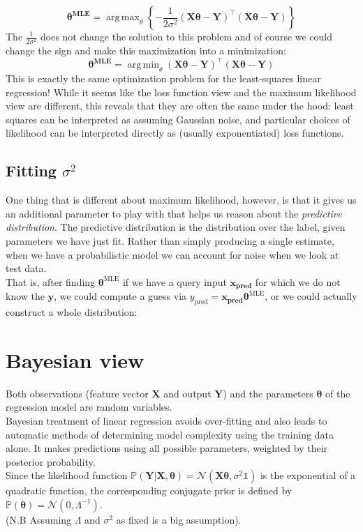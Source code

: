 \documentclass[twoside]{article}
\DeclareMathOperator*{\argmax}{arg\,max}
\DeclareMathOperator*{\argmin}{arg\,min}
\begin{document}
\begin{equation*}
    \boldsymbol{\theta^{\text{MLE}}} = \argmax_{\theta}\left\{ -\frac{1}{2\sigma^2}(\boldsymbol{X\theta} - \boldsymbol{Y})^{\intercal}(\boldsymbol{X\theta} - \boldsymbol{Y}) \right\}
\end{equation*}
The $\frac{1}{2\sigma^2}$ does not change the solution to this problem and of course we could change the sign and make
this maximization into a minimization:
\begin{equation*}
    \boldsymbol{\theta^{\text{MLE}}} = \argmin_{\theta}(\boldsymbol{X\theta} - \boldsymbol{Y})^{\intercal}(\boldsymbol{X\theta} - \boldsymbol{Y})
\end{equation*}
This is exactly the same optimization problem for the least-squares linear regression! While it seems like the loss function view and the maximum likelihood view are different, this reveals that they are often the same under the hood: least squares can be interpreted as assuming Gaussian noise, and particular choices of likelihood can be interpreted directly as (usually exponentiated) loss functions.
\subsection{Fitting $\sigma^2$}
One thing that is different about maximum likelihood, however, is that it gives us an additional parameter to play with that helps us reason about the \textit{predictive distribution}. The predictive distribution is the distribution over the label, given parameters we have just fit. Rather than simply producing a single estimate, when we have a probabilistic model we can account for noise when we look at test data.\\
That is, after finding $\boldsymbol{\theta}^{\text{MLE}}$ if we have a query input $\boldsymbol{x_{\text{pred}}}$ for which we do not know the $\boldsymbol{y}$, we could compute a guess via $y_{\text{pred}} = \boldsymbol{x_{\text{pred}}}\boldsymbol{\theta}^{\text{MLE}}$, or we could actually construct a whole distribution:




\section{Bayesian view}
Both observations (feature vector $\boldsymbol{X}$ and output $\boldsymbol{Y}$) and the parameters $\boldsymbol{\theta}$ of the regression model are random variables.\\
Bayesian treatment of linear regression avoids over-fitting and also leads to automatic methods of determining model complexity using the training data alone. It makes predictions using all possible parameters, weighted by their posterior probability.\\
Since the likelihood function $\mathbb{P}(\boldsymbol{Y}|\boldsymbol{X},\boldsymbol{\theta}) = \mathcal{N}(\boldsymbol{X}\boldsymbol{\theta}, \sigma^2\mathds{1})$ is the exponential of a quadratic function, the corresponding conjugate prior is defined by $\mathbb{P}(\boldsymbol{\theta}) = \mathcal{N}(0,\Lambda^{-1})$.\\
(N.B Assuming $\Lambda$ and $\sigma^2$ as fixed is a big assumption).\medskip
\end{document}
